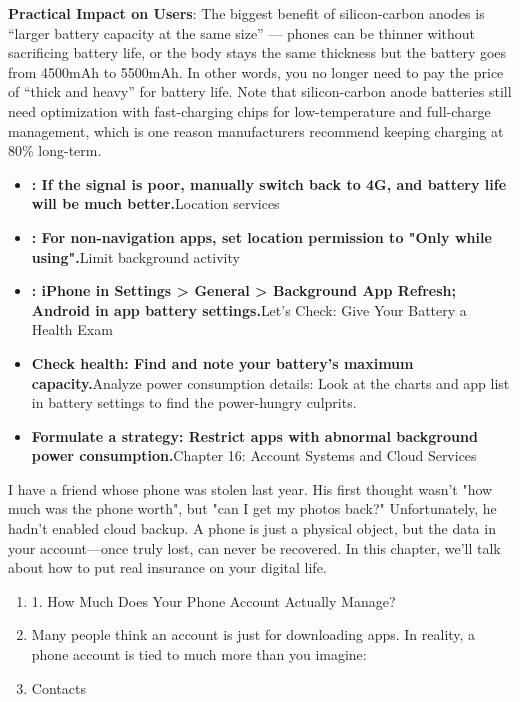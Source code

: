 \textbf{Practical Impact on Users}: The biggest benefit of silicon-carbon anodes is “larger battery capacity at the same size” — phones can be thinner without sacrificing battery life, or the body stays the same thickness but the battery goes from 4500mAh to 5500mAh. In other words, you no longer need to pay the price of “thick and heavy” for battery life. Note that silicon-carbon anode batteries still need optimization with fast-charging chips for low-temperature and full-charge management, which is one reason manufacturers recommend keeping charging at 80\% long-term.


\begin{itemize}
  \item \textbf{: If the signal is poor, manually switch back to 4G, and battery life will be much better.}Location services
  \item \textbf{: For non-navigation apps, set location permission to "Only while using".}Limit background activity
  \item \textbf{: iPhone in Settings > General > Background App Refresh; Android in app battery settings.}Let's Check: Give Your Battery a Health Exam
  \item \textbf{Check health: Find and note your battery's maximum capacity.}Analyze power consumption details: Look at the charts and app list in battery settings to find the power-hungry culprits.
  \item \textbf{Formulate a strategy: Restrict apps with abnormal background power consumption.}Chapter 16: Account Systems and Cloud Services
\end{itemize}

\begin{tcbpractice}{I have a friend whose phone was stolen last year. His first thought wasn't "how much was the phone worth", but "can I get my photos back?" Unfortunately, he hadn't enabled cloud backup. A phone is just a physical object, but the data in your account—once truly lost, can never be recovered. In this chapter, we'll talk about how to put real insurance on your digital life.}
\begin{enumerate}
  \item 1. How Much Does Your Phone Account Actually Manage?
  \item Many people think an account is just for downloading apps. In reality, a phone account is tied to much more than you imagine:
  \item Contacts
\end{enumerate}

\end{tcbpractice}
